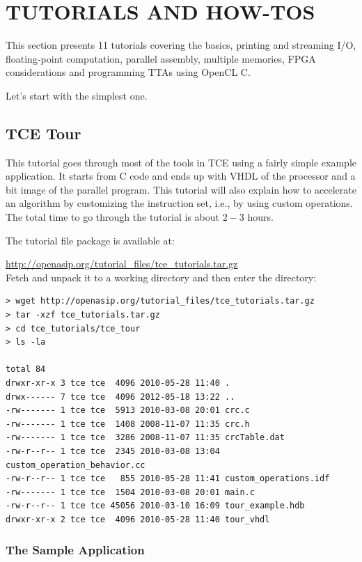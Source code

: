 \documentclass[twoside]{tceusermanual}
\begin{document}
\chapter{TUTORIALS AND HOW-TOS}
\label{chapter:tutorials}

This section presents 11 tutorials covering the basics, printing and
streaming I/O, floating-point computation, parallel assembly, multiple
memories, FPGA considerations and programming TTAs using OpenCL C.

Let's start with the simplest one.

\section{TCE Tour}
\label{sec:tcetour}

This tutorial goes through most of the tools in TCE using a fairly simple
example application. It starts from C code and ends up with VHDL of the
processor and a bit image of the parallel program. This tutorial will also
explain how to accelerate an algorithm by customizing the instruction
set, i.e., by using custom operations. The total time to go through
the tutorial is about $2-3$ hours.

The tutorial file package is available at:

\url{http://openasip.org/tutorial_files/tce_tutorials.tar.gz}\\

Fetch and unpack it to a working directory and then enter the directory:

\begin{verbatim}
> wget http://openasip.org/tutorial_files/tce_tutorials.tar.gz
> tar -xzf tce_tutorials.tar.gz
> cd tce_tutorials/tce_tour
> ls -la

total 84
drwxr-xr-x 3 tce tce  4096 2010-05-28 11:40 .
drwx------ 7 tce tce  4096 2012-05-18 13:22 ..
-rw------- 1 tce tce  5913 2010-03-08 20:01 crc.c
-rw------- 1 tce tce  1408 2008-11-07 11:35 crc.h
-rw------- 1 tce tce  3286 2008-11-07 11:35 crcTable.dat
-rw-r--r-- 1 tce tce  2345 2010-03-08 13:04 custom_operation_behavior.cc
-rw-r--r-- 1 tce tce   855 2010-05-28 11:41 custom_operations.idf
-rw------- 1 tce tce  1504 2010-03-08 20:01 main.c
-rw-r--r-- 1 tce tce 45056 2010-03-10 16:09 tour_example.hdb
drwxr-xr-x 2 tce tce  4096 2010-05-28 11:40 tour_vhdl
\end{verbatim}


\subsection{The Sample Application}
\end{document}

